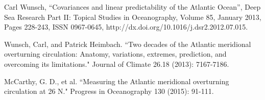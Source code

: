 \documentclass[a4paper,11pt]{article}
\newcommand{\red}[1]{\textcolor{red}{#1}}
\begin{document}
  
  
  
  
  


  
  

  
\begin{thebibliography}{3}

  Carl Wunsch, ``Covariances and linear predictability of the Atlantic Ocean'', Deep Sea Research Part II: Topical Studies in Oceanography, Volume 85, January 2013, Pages 228-243, ISSN 0967-0645, http://dx.doi.org/10.1016/j.dsr2.2012.07.015.
  
  Wunsch, Carl, and Patrick Heimbach. ``Two decades of the Atlantic meridional overturning circulation: Anatomy, variations, extremes, prediction, and overcoming its limitations." Journal of Climate 26.18 (2013): 7167-7186.
  
  McCarthy, G. D., et al. ``Measuring the Atlantic meridional overturning circulation at 26 N." Progress in Oceanography 130 (2015): 91-111.

\end{thebibliography}
\end{document}
